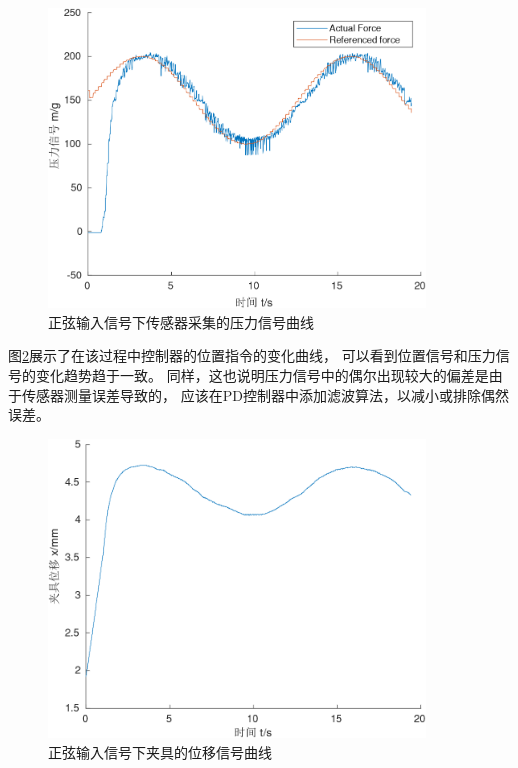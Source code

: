 \begin{figure}[!ht]
  \centering
  \includegraphics[width=10cm]{chapter04/pic/sin}
  \caption{\label{fig:sin}
    正弦输入信号下传感器采集的压力信号曲线}
  \vspace{-0.3cm}
\end{figure}

图\ref{fig:sin_x}展示了在该过程中控制器的位置指令的变化曲线，
可以看到位置信号和压力信号的变化趋势趋于一致。
同样，这也说明压力信号中的偶尔出现较大的偏差是由于传感器测量误差导致的，
应该在PD控制器中添加滤波算法，以减小或排除偶然误差。

\begin{figure}[!ht]
  \centering
  \includegraphics[width=10cm]{chapter04/pic/sin_x}
  \caption{\label{fig:sin_x}
    正弦输入信号下夹具的位移信号曲线}
  \vspace{-0.3cm}
\end{figure}

